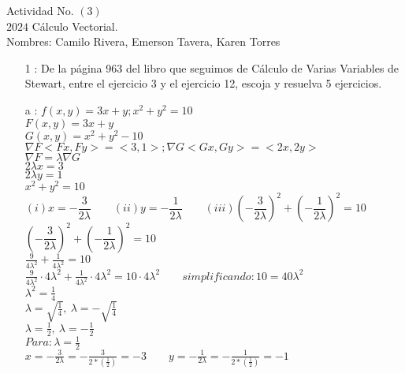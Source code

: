 \documentclass[13pt]{memoir}
\begin{document}
\begin{center}
			\centering
			Actividad No. $(3)$\\
			$2024$ Cálculo Vectorial.\\
			Nombres:  Camilo Rivera, Emerson Tavera, Karen Torres
\end{center}

\begin{enumerate}

\item[ 1]: De la página 963 del libro que seguimos de Cálculo de Varias Variables de Stewart, entre el ejercicio 3 y el ejercicio 12, escoja y resuelva 5 ejercicios.\\

\item[ a]: $f(x, y) = 3x + y; x^2 + y^2 = 10 $ \\

$F(x, y) = 3x + y$ \\
$G(x, y) = x^2 + y^2 - 10 $ \\

$\nabla F <Fx, Fy> = <3,1>; \nabla G <Gx, Gy> = <2x,2y>$ \\
$\nabla F = \lambda \nabla G$ \\

$2 \lambda x = 3$ \\
$2 \lambda y = 1$ \\
$x^2 + y^2 = 10$\\

$(i) x = - \dfrac{3}{2 \lambda} \qquad (ii) y = - \dfrac{1}{2 \lambda} \qquad (iii)  \left(- \dfrac{3}{2 \lambda}\right)^2 + \left(- \dfrac{1}{2 \lambda}\right)^2 = 10$\\

$\left(- \dfrac{3}{2 \lambda}\right)^2 + \left(- \dfrac{1}{2 \lambda}\right)^2 = 10$\\

$\frac{9}{4 \lambda ^2}+\frac{1}{4 \lambda ^2}=10$\\
$\frac{9}{4\lambda^2} \cdot 4\lambda^2 + \frac{1}{4\lambda^2} \cdot 4\lambda^2 = 10 \cdot 4\lambda^2
\qquad simplificando: 10 = 40 \lambda ^2$\\

$ \lambda ^2 = \frac{1}{4}$\\
$ \lambda = \sqrt{\frac{1}{4}},\: \lambda =-\sqrt{\frac{1}{4}}$\\
$ \lambda = \frac{1}{2},\: \lambda =-\frac{1}{2}$\\

$ Para: \lambda = \frac{1}{2}$\\
$x = -\frac{3}{2\lambda} = -\frac{3}{2*\left(\frac{1}{2} \right)}  = -3 \qquad y = -\frac{1}{2\lambda} = -\frac{1}{2*\left( \frac{1}{2} \right)} = -1$\\


\end{enumerate}
\end{document}
